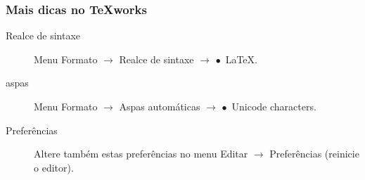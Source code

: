 \begin{frame}
  \frametitle{Mais dicas no \TeX works}

  \begin{description}
  \item[Realce de sintaxe] Menu Formato $\to$ Realce de sintaxe $\to$
    $\bullet$~LaTeX.
  \item[aspas] Menu Formato $\to$ Aspas automáticas $\to$ $\bullet$~Unicode characters.
  \item[Preferências] Altere também estas preferências no menu Editar
    $\to$ Preferências (reinicie o editor).
  \end{description}

\end{frame}

